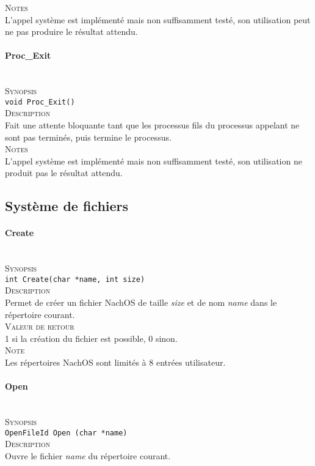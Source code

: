 \documentclass{report}
\newcommand{\myparagraph}[1]{\paragraph*{#1}\mbox{}\\}
\begin{document}
\textsc{Notes}\\
	L'appel système est implémenté mais non suffisamment testé, son utilisation peut ne pas produire le résultat attendu.\\
	

\myparagraph{Proc\_Exit}

\textsc{Synopsis}\\	
	\texttt{void Proc\_Exit()}\\
	
\textsc{Description}\\
	Fait une attente bloquante tant que les processus fils du processus appelant ne sont pas terminés, puis termine le processus.\\
	
\textsc{Notes}\\
	L'appel système est implémenté mais non suffisamment testé, son utilisation ne produit pas le résultat attendu.\\
	
	
\subsection*{Système de fichiers}
\myparagraph{Create}

\textsc{Synopsis}\\	
	\texttt{int Create(char *name, int size)}\\
	
\textsc{Description}\\
	Permet de créer un fichier NachOS de taille \textit{size} et de nom \textit{name} dans le répertoire courant.\\	

\textsc{Valeur de retour}\\
1 si la création du fichier est possible, 0 sinon.\\

\textsc{Note}\\
	Les répertoires NachOS sont limités à 8 entrées utilisateur.\\
\myparagraph{Open}

\textsc{Synopsis}\\	
	\texttt{OpenFileId Open (char *name)}\\
	
\textsc{Description}\\
	Ouvre le fichier \textit{name} du répertoire courant.\\	
\end{document}
